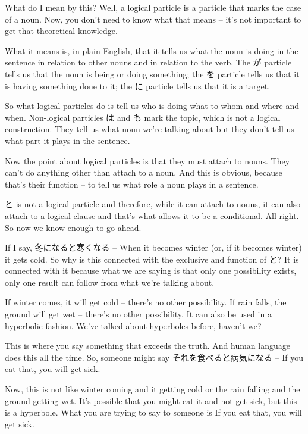 {}

What do I mean by this? Well, a logical particle is a particle that marks the case of a noun. Now, you don't need to know what that means -- it's not important to get that theoretical knowledge.

What it means is, in plain English, that it tells us what the noun is doing in the sentence in relation to other nouns and in relation to the verb. The が particle tells us that the noun is being or doing something; the を particle tells us that it is having something done to it; the に particle tells us that it is a target.

{}

So what logical particles do is tell us who is doing what to whom and where and when. Non-logical particles は and も mark the topic, which is not a logical construction. They tell us what noun we're talking about but they don't tell us what part it plays in the sentence.

Now the point about logical particles is that they must attach to nouns. They can't do anything other than attach to a noun. And this is obvious, because that's their function -- to tell us what role a noun plays in a sentence.

と is not a logical particle and therefore, while it can attach to nouns, it can also attach to a logical clause and that's what allows it to be a conditional. All right. So now we know enough to go ahead.

If I say, 冬になると寒くなる -- When it becomes winter (or, if it becomes winter) it gets cold. So why is this connected with the exclusive and function of と? It is connected with it because what we are saying is that only one possibility exists, only one result can follow from what we're talking about.

If winter comes, it will get cold -- there's no other possibility. If rain falls, the ground will get wet -- there's no other possibility. It can also be used in a hyperbolic fashion. We've talked about hyperboles before, haven't we?

This is where you say something that exceeds the truth. And human language does this all the time. So, someone might say それを食べると病気になる -- If you eat that, you will get sick.

{}

Now, this is not like winter coming and it getting cold or the rain falling and the ground getting wet. It's possible that you might eat it and not get sick, but this is a hyperbole. What you are trying to say to someone is If you eat that, you will get sick.

